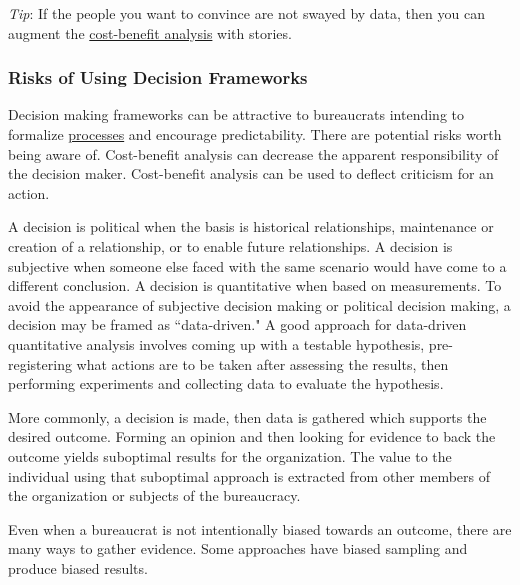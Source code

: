 \textit{Tip}: If the people you want to convince are not swayed by data, then you can augment the \href{https://en.wikipedia.org/wiki/Cost\%E2\%80\%93benefit_analysis}{cost-benefit analysis} with stories. 

\subsubsection{Risks of Using Decision Frameworks}

Decision making frameworks can be attractive to bureaucrats intending to formalize 
\hyperref[sec:process]{processes} 
and encourage predictability. There are potential risks worth being aware of.  Cost-benefit analysis can decrease the apparent responsibility of the decision maker. Cost-benefit analysis can be used to deflect criticism for an action. 

A decision is political when the basis is historical relationships, maintenance or creation of a relationship, or to enable future relationships. A decision is subjective when someone else faced with the same scenario would have come to a different conclusion.
A decision is quantitative when based on measurements. To avoid the appearance of subjective decision making or political decision making, a decision may be framed as ``data-driven." 
A good approach for data-driven quantitative analysis involves coming up with a testable hypothesis, pre-registering what actions are to be taken after assessing the results, then performing experiments and collecting data to evaluate the hypothesis. 

More commonly, a decision is made, then data is gathered which supports the desired outcome. Forming an opinion and then looking for evidence to back the outcome yields suboptimal results for the organization. The value to the individual using that suboptimal approach is extracted from other members of the organization or subjects of the bureaucracy. 

Even when a bureaucrat is not intentionally biased towards an outcome, there are many ways to gather evidence. Some approaches have biased sampling and produce biased results.

